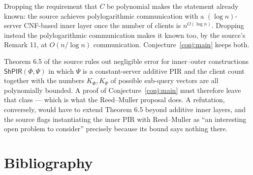 \documentclass{conjura-conjecture}
\newcommand{\ShPIR}{\mathsf{ShPIR}}
\begin{document}
\begin{remark}
Dropping the requirement that $C$ be polynomial makes the statement
already known: the source achieves polylogarithmic communication with a
$(\log n)$-server CNF-based inner layer once the number of clients is
$n^{O(\log n)}$. Dropping instead the polylogarithmic communication
makes it known too, by the source's Remark 11, at $O(n/\log n)$
communication. Conjecture~\ref{conj:main} keeps both.
\end{remark}

\begin{remark}
Theorem 6.5 of the source rules out negligible error for
inner--outer constructions $\ShPIR(\Phi, \Psi)$ in which $\Psi$ is a
constant-server additive PIR and the client count together with the
numbers $K_{\Phi}, K_{\Psi}$ of possible sub-query vectors are all
polynomially bounded. A proof of Conjecture~\ref{conj:main} must
therefore leave that class --- which is what the Reed--Muller proposal
does. A refutation, conversely, would have to extend Theorem 6.5 beyond
additive inner layers, and the source flags instantiating the inner PIR
with Reed--Muller as ``an interesting open problem to consider''
precisely because its bound says nothing there.
\end{remark}

\section{Bibliography}
\end{document}
